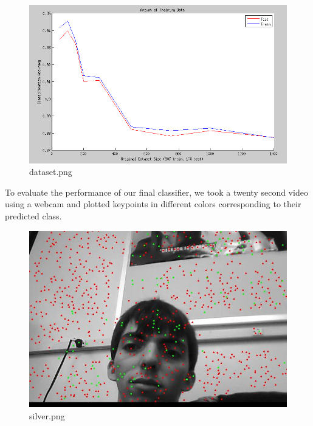 \documentclass[11pt, twocolumn]{article}
\begin{document}
\begin{figure}[h!]
    \centering
    \includegraphics[scale=0.3]{./imgs/dataset.png}
    \caption{
        dataset.png
    }
\end{figure}

To evaluate the performance of our final classifier, we took a twenty second video using a webcam
and plotted keypoints in different colors corresponding to their predicted class.

\begin{figure}[h!]
    \centering
    \includegraphics[scale=0.3]{./imgs/silver.png}
    \caption{
        silver.png
    }
\end{figure}
\end{document}
